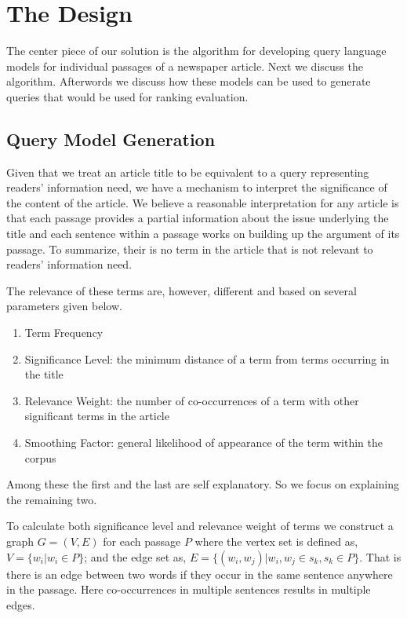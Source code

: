 \documentclass[article]{IEEEtran}
\begin{document}
\section{The Design}
\label{des}
The center piece of our solution is the algorithm for developing query language models for individual passages of a newspaper article. Next we discuss the algorithm. Afterwords we discuss how these models can be used to generate queries that would be used for ranking evaluation.   

\subsection{Query Model Generation}
Given that we treat an article title to be equivalent to a query representing readers' information need, we have a mechanism to interpret the significance of the content of the article. We believe a reasonable interpretation for any article is that each passage provides a partial information about the issue underlying the title and each sentence within a passage works on building up the argument of its passage. To summarize, their is no term in the article that is not relevant to readers' information need.     

The relevance of these terms are, however, different and based on several parameters given below. 

\begin{enumerate}
\item Term Frequency
\item Significance Level: the minimum distance of a term from terms occurring in the title
\item Relevance Weight: the number of co-occurrences of a term with other significant terms in the article 
\item Smoothing Factor: general likelihood of appearance of the term within the corpus      
\end{enumerate}

Among these the first and the last are self explanatory. So we focus on explaining the remaining two.

To calculate both significance level and relevance weight of terms we construct a graph ${G = (V, E)}$ for each passage $P$ where the vertex set is defined as, $V = \{w_i | w_i \in P\}$; and the edge set as, $E = \{(w_i, w_j) | w_i, w_j \in s_k, s_k \in P\}$. That is there is an edge between two words if they occur in the same sentence anywhere in the passage. Here co-occurrences in multiple sentences results in multiple edges. 
\end{document}
